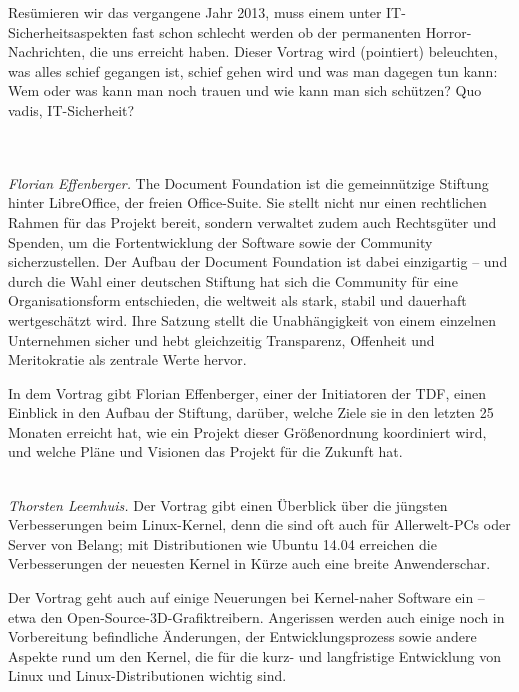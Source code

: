 \documentclass[10pt,a4paper,ngerman,landscape]{scrartcl}
\let\origdescription\description
\renewenvironment{description}{
  \setlength{\leftmargini}{0em}
  \origdescription
  \setlength{\itemindent}{0em}
  \setlength{\itemsep}{1.2em}
  \setlength{\labelsep}{\textwidth}
}
{\endlist}
\newcommand{\vorschub}{\mbox{}\\[-0.5em]}
\begin{document}
\begin{multicols}{3}
\begin{description}
Resümieren wir das vergangene Jahr 2013, muss einem unter
IT-Sicherheitsaspekten fast schon schlecht werden ob der permanenten
Horror-Nachrichten, die uns erreicht haben. Dieser Vortrag wird (pointiert)
beleuchten, was alles schief gegangen ist, schief gehen wird und was man
dagegen tun kann: Wem oder was kann man noch trauen und wie kann man sich
schützen? Quo vadis, IT-Sicherheit?




\item[{\parbox[t]{\linewidth}{The Document Foundation -- ein Blick hinter die Kulissen}}]\vorschub\\
\textsl{Florian Effenberger.}
The Document Foundation ist die gemeinnützige Stiftung hinter LibreOffice, der
freien Office-Suite. Sie stellt nicht nur einen rechtlichen Rahmen für das
Projekt bereit, sondern verwaltet zudem auch Rechtsgüter und Spenden, um die
Fortentwicklung der Software sowie der Community sicherzustellen. Der Aufbau
der Document Foundation ist dabei einzigartig -- und durch die Wahl einer
deutschen Stiftung hat sich die Community für eine Organisationsform
entschieden, die weltweit als stark, stabil und dauerhaft wertgeschätzt wird.
Ihre Satzung stellt die Unabhängigkeit von einem einzelnen Unternehmen sicher
und hebt gleichzeitig Transparenz, Offenheit und Meritokratie als zentrale
Werte hervor.

In dem Vortrag gibt Florian Effenberger, einer der Ini\-ti\-a\-to\-ren der TDF, einen
Einblick in den Aufbau der Stiftung, darüber, welche Ziele sie in den letzten
25 Monaten erreicht hat, wie ein Projekt dieser Größenordnung koordiniert wird,
und welche Pläne und Visionen das Projekt für die Zukunft hat.


\item[Aktuelle Entwicklungen beim Linux-Kernel]\vorschub
\textsl{Thorsten Leemhuis.}
Der Vortrag gibt einen Überblick über die jüngsten Verbesserungen beim
Linux-Kernel, denn die sind oft auch für Allerwelt-PCs oder Server von Belang;
mit Distributionen wie Ubuntu 14.04 erreichen die Verbesserungen der neuesten
Kernel in Kürze auch eine breite Anwenderschar.

Der Vortrag geht auch auf einige Neuerungen bei Kernel-naher Software ein --
etwa den Open-Source-3D-Grafiktreibern. Angerissen werden auch einige noch in
Vorbereitung befindliche Änderungen, der Entwicklungsprozess sowie andere
Aspekte rund um den Kernel, die für die kurz- und langfristige Entwicklung von
Linux und Linux-Distributionen wichtig sind.


\end{description}
\end{multicols}
\end{document}
